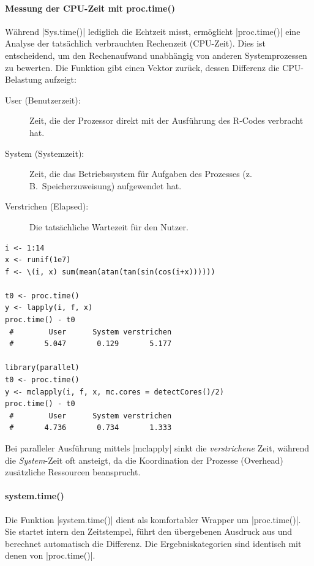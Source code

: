 \documentclass[10pt,twocolumn]{scrartcl}
\renewcommand{\lstinline}{\mycoloredinline}
\begin{document}
\paragraph{Messung der CPU-Zeit mit proc.time()}

Während \lstinline|Sys.time()| lediglich die Echtzeit misst, ermöglicht \lstinline|proc.time()| eine Analyse der tatsächlich verbrauchten Rechenzeit (CPU-Zeit). Dies ist entscheidend, um den Rechenaufwand unabhängig von anderen Systemprozessen zu bewerten. Die Funktion gibt einen Vektor zurück, dessen Differenz die CPU-Belastung aufzeigt:

\begin{description}
\item[User (Benutzerzeit):] Zeit, die der Prozessor direkt mit der Ausführung des R-Codes verbracht hat.
\item[System (Systemzeit):] Zeit, die das Betriebssystem für Aufgaben des Prozesses (z.\,B.\ Speicherzuweisung) aufgewendet hat.
\item[Verstrichen (Elapsed):] Die tatsächliche Wartezeit für den Nutzer.
\end{description}

\begin{lstlisting}
i <- 1:14
x <- runif(1e7)
f <- \(i, x) sum(mean(atan(tan(sin(cos(i+x))))))

t0 <- proc.time()
y <- lapply(i, f, x)
proc.time() - t0
 #        User      System verstrichen 
 #       5.047       0.129       5.177 

library(parallel)
t0 <- proc.time()
y <- mclapply(i, f, x, mc.cores = detectCores()/2)
proc.time() - t0
 #        User      System verstrichen 
 #       4.736       0.734       1.333 
\end{lstlisting}

Bei paralleler Ausführung mittels \lstinline|mclapply| sinkt die \emph{verstrichene} Zeit, während die \emph{System}-Zeit oft ansteigt, da die Koordination der Prozesse (Overhead) zusätzliche Ressourcen beansprucht.


\paragraph{system.time()}

Die Funktion \lstinline|system.time()| dient als komfortabler Wrapper um \lstinline|proc.time()|. Sie startet intern den Zeitstempel, führt den übergebenen Ausdruck aus und berechnet automatisch die Differenz. Die Ergebniskategorien sind identisch mit denen von \lstinline|proc.time()|.
\end{document}
